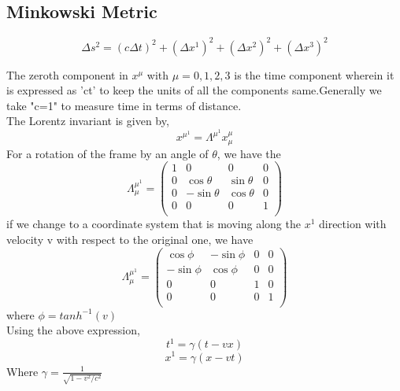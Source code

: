 \subsection{Minkowski Metric}
\begin{tcolorbox}
  \begin{equation}
     \Delta s^{2} = (c \Delta t)^{2} + (\Delta x^{1})^{2} + (\Delta x^{2})^{2} + (\Delta x^{3})^{2}
  \end{equation}
\end{tcolorbox}
The zeroth component in $x^{\mu}$ with $\mu = 0,1,2,3$ is the time component wherein it is expressed as 'ct' to keep the units of all the components same.Generally we take "c=1" to measure time in terms of distance. \\
The Lorentz invariant is given by, 
\begin{equation}
x^{\mu^{1}} = \Lambda ^{\mu ^{1}} x_{\mu} ^{\mu}
\end{equation}
For a rotation of the frame by an angle of $\theta$, we have the 
\begin{equation}
    \Lambda ^{\mu ^{1}}_{\mu} =  \begin{pmatrix}
1 & 0 & 0 & 0 \\
0 & \cos \theta & \sin \theta & 0\\
0 & -\sin \theta & \cos \theta & 0 \\
0 & 0 & 0 & 1 \\
\end{pmatrix}
\end{equation}
if we change to a coordinate system that is moving along the $x^{1}$ direction
with velocity v with respect to the original one, we have
\begin{equation}
    \Lambda ^{\mu ^{1}} _{\mu}  =  \begin{pmatrix}
\cos \phi & -\sin \phi & 0 & 0\\
-\sin \phi & \cos \phi & 0 & 0 \\
0 & 0 & 1 & 0 \\
0 & 0 & 0 & 1 \\
\end{pmatrix}
\end{equation}
where $\phi = tanh^{-1}(v) $ \\ 
Using the above expression, 
\begin{equation}
t^{1} = \gamma (t-vx)
\end{equation}
\begin{equation}
    x^{1} = \gamma (x-vt)
\end{equation} 
Where $\gamma = \frac{1}{\sqrt{1-v^{2}/c^{2}}}$ 

